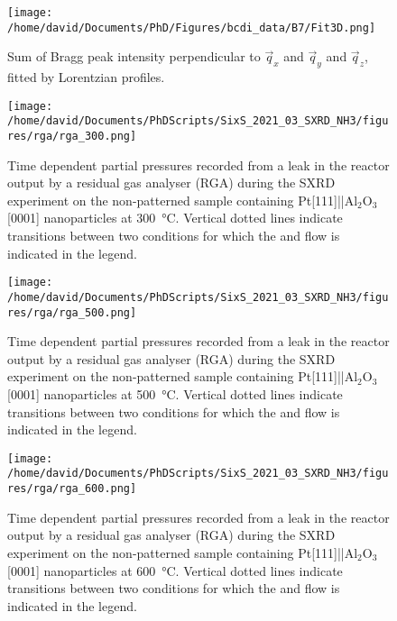 \begin{figure}[!htb]
    \centering
    \texttt{[image: /home/david/Documents/PhD/Figures/bcdi\_data/B7/Fit3D.png]}
    \caption{
        Sum of Bragg peak intensity perpendicular to $\vec{q}_x$ and $\vec{q}_y$ and $\vec{q}_z$, fitted by Lorentzian profiles.
    }
    \label{fig:FitB73D}
\end{figure}


\begin{figure}[!htb]
    \centering
    \texttt{[image: /home/david/Documents/PhDScripts/SixS\_2021\_03\_SXRD\_NH3/figures/rga/rga\_300.png]}
    \caption{
        Time dependent partial pressures recorded from a leak in the reactor output by a residual gas analyser (RGA) during the SXRD experiment on the non-patterned sample containing Pt[111]||Al$_2$O$_3$[0001] nanoparticles at \qty{300}{\degreeCelsius}.
        Vertical dotted lines indicate transitions between two conditions for which the  and  flow is indicated in the legend.
    }
    \label{fig:RGA300SXRDNanoparticles}
\end{figure}

\begin{figure}[!htb]
    \centering
    \texttt{[image: /home/david/Documents/PhDScripts/SixS\_2021\_03\_SXRD\_NH3/figures/rga/rga\_500.png]}
    \caption{
        Time dependent partial pressures recorded from a leak in the reactor output by a residual gas analyser (RGA) during the SXRD experiment on the non-patterned sample containing Pt[111]||Al$_2$O$_3$[0001] nanoparticles at \qty{500}{\degreeCelsius}.
        Vertical dotted lines indicate transitions between two conditions for which the  and  flow is indicated in the legend.
    }
    \label{fig:RGA500SXRDNanoparticles}
\end{figure}

\begin{figure}[!htb]
    \centering
    \texttt{[image: /home/david/Documents/PhDScripts/SixS\_2021\_03\_SXRD\_NH3/figures/rga/rga\_600.png]}
    \caption{
        Time dependent partial pressures recorded from a leak in the reactor output by a residual gas analyser (RGA) during the SXRD experiment on the non-patterned sample containing Pt[111]||Al$_2$O$_3$[0001] nanoparticles at \qty{600}{\degreeCelsius}.
        Vertical dotted lines indicate transitions between two conditions for which the  and  flow is indicated in the legend.
    }
    \label{fig:RGA600SXRDNanoparticles}
\end{figure}

